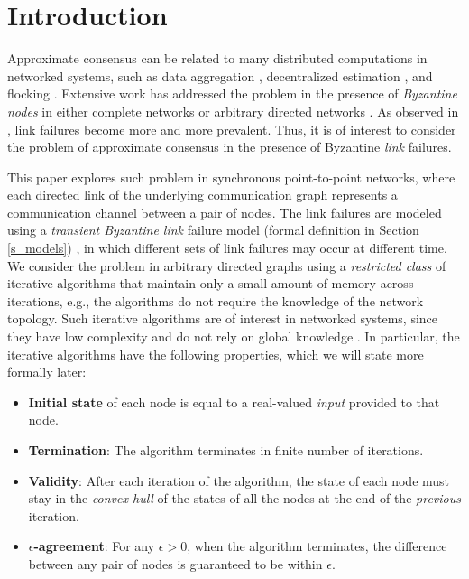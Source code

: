 \documentclass{llncs}
\begin{document}
\section{Introduction}
\label{s_intro}
Approximate consensus can be related to many distributed computations in networked systems, such as data aggregation \cite{Kempe_gossip}, decentralized estimation  \cite{noisy_link}, and flocking \cite{Jadbabaie}. Extensive work has addressed the problem in the presence of {\em Byzantine nodes} \cite{psl_BG_1982} in either complete networks \cite{AA_Dolev_1986,AA_optimal} or arbitrary directed networks \cite{vaidya_PODC12,Sundaram_condition,Tseng_general}. As observed in \cite{Biely_hybrid,Schmid_link}, link failures become more and more prevalent. Thus, it is of interest to consider the problem of approximate consensus in the presence of Byzantine {\em link} failures.

This paper explores such problem in synchronous point-to-point networks, where each directed link of the underlying communication graph represents a communication channel between a pair of nodes. The link failures are modeled using a {\em transient Byzantine link} failure model (formal definition in Section \ref{s_models}) \cite{Santoro_link,Santoro_link2}, in which different sets of link failures may occur at different time. We consider the problem in arbitrary directed graphs using a {\em restricted class} of iterative algorithms that maintain only a small amount of memory across iterations, e.g., the algorithms do not require the knowledge of the network topology. Such iterative algorithms are of interest in networked systems, since they have low complexity and do not rely on global knowledge \cite{Sundaram_condition}. In particular, the iterative algorithms have the following properties, which we will state more formally later:

\begin{itemize}
\item {\bf Initial state} of each node is equal to a real-valued {\em input} provided to that node.

\item {\bf Termination}: The algorithm terminates in finite number of iterations.

\item {\bf Validity}: After each iteration of the algorithm, the state of each node must stay in the {\em convex hull} of the states of all the nodes at the end of the {\em previous} iteration.

\item {\bf $\epsilon$-agreement}: For any $\epsilon > 0$, when the algorithm terminates, the difference between any pair of nodes is guaranteed to be within $\epsilon$.
\end{itemize}
\end{document}
